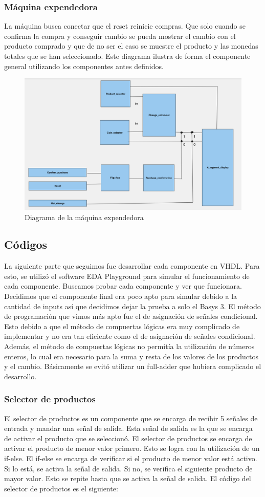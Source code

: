\documentclass[12pt]{article}  %
\begin{document}
\newpage

\subsubsection{Máquina expendedora}
La máquina busca conectar que el reset reinicie compras. Que solo cuando se confirma la compra y conseguir cambio se pueda mostrar el cambio con el producto comprado y que de no ser el caso se muestre el producto y las monedas totales que se han seleccionado. Este diagrama ilustra de forma el componente general utilizando los componentes antes definidos.

\begin{figure}[!ht]
  \centering
  \caption{Diagrama de la máquina expendedora}
  \includegraphics[width=0.25\linewidth]{Imagenes/Diagramas/vending-machine-diagram.png}
\end{figure}

\subsection{Códigos}
La siguiente parte que seguimos fue desarrollar cada componente en VHDL. Para esto, se utilizó el software EDA Playground para simular el funcionamiento de cada componente. Buscamos probar cada componente y ver que funcionara. Decidimos que el componente final era poco apto para simular debido a la cantidad de inputs así que decidimos dejar la prueba a solo el Basys 3. El método de programación que vimos más apto fue el de asignación de señales condicional. Esto debido a que el método de compuertas lógicas era muy complicado de implementar y no era tan eficiente como el de asignación de señales condicional. Además, el método de compuertas lógicas no permitía la utilización de números enteros, lo cual era necesario para la suma y resta de los valores de los productos y el cambio. Básicamente se evitó utilizar un full-adder que hubiera complicado el desarrollo.

\subsubsection{Selector de productos}
El selector de productos es un componente que se encarga de recibir 5 señales de entrada y mandar una señal de salida. Esta señal de salida es la que se encarga de activar el producto que se seleccionó. El selector de productos se encarga de activar el producto de menor valor primero. Esto se logra con la utilización de un if-else. El if-else se encarga de verificar si el producto de menor valor está activo. Si lo está, se activa la señal de salida. Si no, se verifica el siguiente producto de mayor valor. Esto se repite hasta que se activa la señal de salida. El código del selector de productos es el siguiente:
\end{document}
